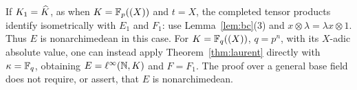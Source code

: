 \begin{remark}\label{rem:spaces}
If $K_1=\widehat K$, as when $K=\mathbb F_p((X))$ and $t=X$, the completed tensor products identify isometrically with
$E_1$ and $F_1$: use Lemma~\ref{lem:bc}(3) and $x\otimes\lambda=\lambda x\otimes1$. Thus $E$ is nonarchimedean in
this case. For $K=\mathbb F_q((X))$, $q=p^n$, with its $X$\nobreakdash-adic absolute value, one can instead apply
Theorem~\ref{thm:laurent} directly with $\kappa=\mathbb F_q$, obtaining $E=\ell^\infty(\mathbb N,K)$ and $F=F_1$.
The proof over a general base field does not require, or assert, that $E$ is nonarchimedean.
\end{remark}
